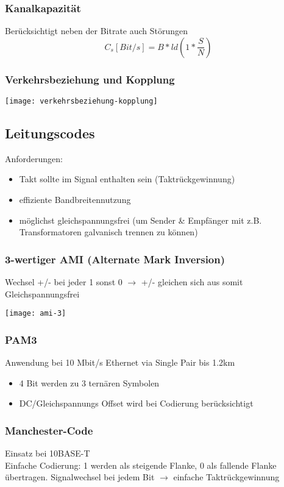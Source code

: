 \subsubsection{Kanalkapazität}
Berücksichtigt neben der Bitrate auch Störungen
$$C_s [Bit/s] = B * ld(1 * \frac{S}{N})$$

\subsubsection{Verkehrsbeziehung und Kopplung}
\begin{center}
    \texttt{[image: verkehrsbeziehung-kopplung]}
\end{center}

\subsection{Leitungscodes}
Anforderungen:
\begin{itemize}
    \item Takt sollte im Signal enthalten sein (Taktrückgewinnung)
    \item effiziente Bandbreitennutzung
    \item möglichst gleichspannungsfrei (um Sender \& Empfänger mit z.B.
          Transformatoren galvanisch trennen zu können)
\end{itemize}


\subsubsection{3-wertiger AMI (Alternate Mark Inversion)}
Wechsel +/- bei jeder 1 sonst 0 $\rightarrow$ +/- gleichen sich aus
somit Gleichspannungsfrei
\begin{center}
    \texttt{[image: ami-3]}
\end{center}

\subsubsection{PAM3}
Anwendung bei 10 Mbit/s Ethernet via Single Pair bis 1.2km
\begin{itemize}
    \item 4 Bit werden zu 3 ternären Symbolen
    \item DC/Gleichspannungs Offset wird bei Codierung berücksichtigt
\end{itemize}

\subsubsection{Manchester-Code}
Einsatz bei 10BASE-T\\
Einfache Codierung: 1 werden als steigende Flanke, 0 als fallende Flanke übertragen.
Signalwechsel bei jedem Bit $\rightarrow$ einfache Taktrückgewinnung

